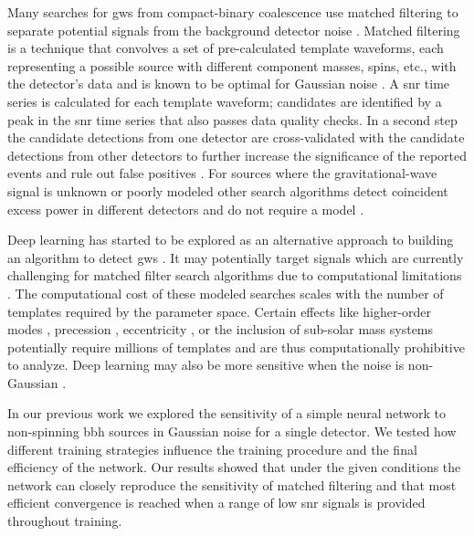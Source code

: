 Many searches for \acrshort{gw}s from compact-binary coalescence use matched filtering to separate potential signals from the background detector noise \cite{LIGOScientific:2020ibl, Messick:2016aqy, DalCanton:2020vpm, Adams:2015ulm}. Matched filtering is a technique that convolves a set of pre-calculated template waveforms, each representing a possible source with different component masses, spins, etc., with the detector's data and is known to be optimal for Gaussian noise \cite{Allen:2005fk}. A \acrfull{snr} time series is calculated for each template waveform; candidates are identified by a peak in the \acrshort{snr} time series that also passes data quality \cite{Nuttall:2015dqa, LIGOScientific:2016emj, LIGOScientific:2019hgc} checks. In a second step the candidate detections from one detector are cross-validated with the candidate detections from other detectors to further increase the significance of the reported events and rule out false positives \cite{LIGOScientific:2020ibl, Usman:2015kfa, Sachdev:2019vvd}. For sources where the gravitational-wave signal is unknown or poorly modeled other search algorithms detect coincident excess power in different detectors and do not require a model \cite{Klimenko:2015ypf}.

Deep learning has started to be explored as an alternative approach to building an algorithm to detect \acrshort{gw}s \cite{George:2016hay, George:2017pmj, Gabbard:2017lja, Dreissigacker:2020xfr, Schafer:2020kor, Krastev:2020skk, Wei:2020ztw, Wei:2020sfz, Cuoco:2020ogp, Huerta:2021ybd}. It may potentially target signals which are currently challenging for matched filter search algorithms due to computational limitations \cite{Wei:2020ztw, Wei:2020xrl, Huerta:2020xyq}. The computational cost of these modeled searches scales with the number of templates required by the parameter space. Certain effects like higher-order modes \cite{Harry:2017weg}, precession \cite{Harry:2016ijz}, eccentricity \cite{Nitz:2019spj,Lenon:2021zac}, or the inclusion of sub-solar mass systems \cite{Nitz:2021mzz, Nitz:2021vqh} potentially require millions of templates and are thus computationally prohibitive to analyze. Deep learning may also be more sensitive when the noise is non-Gaussian \cite{Zevin:2016qwy, Essick:2020qpo, Wei:2020sfz}.

In our previous work \cite{Schafer:2021fea} we explored the sensitivity of a simple neural network to non-spinning \acrshort{bbh} sources in Gaussian noise for a single detector. We tested how different training strategies influence the training procedure and the final efficiency of the network. Our results showed that under the given conditions the network can closely reproduce the sensitivity of matched filtering and that most efficient convergence is reached when a range of low \acrshort{snr} signals is provided throughout training.

